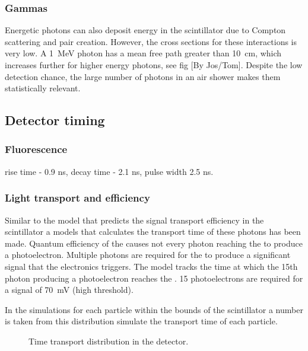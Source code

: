 \subsubsection{Gammas}


Energetic photons can also deposit energy in the scintillator due to Compton scattering and pair creation. However, the cross sections for these interactions is very low. A \SI{1}{\MeV} photon  has a mean free path greater than \SI{10}{\centi\meter}, which increases further for higher energy photons, see fig [By Jos/Tom]. Despite the low detection chance, the large number of photons in an air shower makes them statistically relevant.


\subsection{Detector timing}

\subsubsection{Fluorescence}

rise time - 0.9 ns, decay time - 2.1 ns, pulse width 2.5 ns.



\subsubsection{Light transport and \pmt efficiency}

Similar to the model that predicts the signal transport efficiency in
the scintillator a models that calculates the transport time of these
photons has been made. Quantum efficiency of the \pmt causes not every
photon reaching the \pmt to produce a photoelectron. Multiple photons
are required for the \pmt to produce a significant signal that the
\hisparc electronics triggers. The model tracks the time at which the
15th photon producing a photoelectron reaches the \pmt. 15
photoelectrons are required for a signal of \SI{70}{\milli\volt} (high
threshold).

In the simulations for each particle within the bounds of the
scintillator a number is taken from this distribution simulate the
transport time of each particle.

\begin{figure}
    \centering
    
    \caption{ Time transport
             distribution in the detector.}
    \label{fig:transport_time}
\end{figure}


